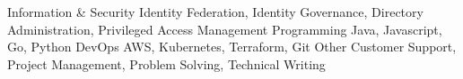 \begin{cvskills}
  \cvskill
    {Information \& Security}
    {Identity Federation, Identity Governance, Directory Administration, Privileged Access Management}
  \cvskill
    {Programming}
    {Java, Javascript, Go, Python}
  \cvskill
    {DevOps}
    {AWS, Kubernetes, Terraform, Git}
  \cvskill
    {Other}
    {Customer Support, Project Management, Problem Solving, Technical Writing}
\end{cvskills}